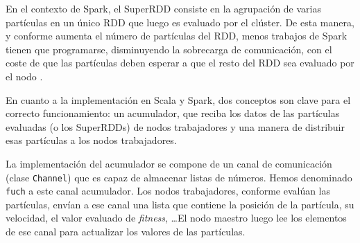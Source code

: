 \vspace{10pt}
En el contexto de Spark, el SuperRDD consiste en la agrupación de varias partículas en un único RDD que luego es
evaluado por el clúster. De esta manera, y conforme aumenta el número de partículas del RDD, menos trabajos de Spark
tienen que programarse, disminuyendo la sobrecarga de comunicación, con el coste de que las partículas deben esperar
a que el resto del RDD sea evaluado por el nodo \cite{dapso}.

\vspace{10pt}
En cuanto a la implementación en Scala y Spark, dos conceptos son clave para el correcto funcionamiento: un 
acumulador, que reciba los datos de las partículas evaluadas (o los SuperRDDs) de nodos trabajadores y una manera de
distribuir esas partículas a los nodos trabajadores. 

\vspace{10pt}
La implementación del acumulador se compone de un canal de comunicación (clase \texttt{Channel}) que es capaz de 
almacenar listas de números. Hemos denominado \texttt{fuch} a este canal acumulador. Los nodos trabajadores, 
conforme evalúan las partículas, envían a ese canal una lista que contiene la posición de la partícula, su 
velocidad, el valor evaluado de \textit{fitness}, \dots El nodo maestro luego lee los elementos de ese canal para 
actualizar los valores de las partículas.

